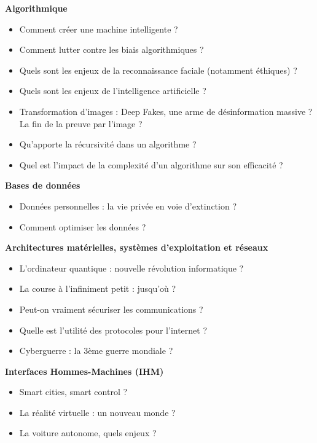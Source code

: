 \textbf{Algorithmique}
\begin{itemize}
    \item Comment créer une machine intelligente ?
    \item Comment lutter contre les biais algorithmiques ?
    \item Quels sont les enjeux de la reconnaissance faciale (notamment éthiques) ?
    \item Quels sont les enjeux de l’intelligence artificielle ?
    \item Transformation d’images : Deep Fakes, une arme de désinformation massive ? La fin
    de la preuve par l’image ?
    \item Qu’apporte la récursivité dans un algorithme ?
    \item Quel est l’impact de la complexité d’un algorithme sur son efficacité ?
\end{itemize}

\textbf{Bases de données}
\begin{itemize}
    \item Données personnelles : la vie privée en voie d’extinction ?
    \item Comment optimiser les données ?
\end{itemize}

\textbf{Architectures matérielles, systèmes d’exploitation et réseaux}
\begin{itemize}
    \item L’ordinateur quantique : nouvelle révolution informatique ?
    \item La course à l’infiniment petit : jusqu’où ?
    \item Peut-on vraiment sécuriser les communications ?
    \item Quelle est l’utilité des protocoles pour l’internet ?
    \item Cyberguerre : la 3ème guerre mondiale ?
\end{itemize}

\textbf{Interfaces Hommes-Machines (IHM)}
\begin{itemize}
    \item Smart cities, smart control ?
    \item La réalité virtuelle : un nouveau monde ?
    \item La voiture autonome, quels enjeux ?
\end{itemize}

